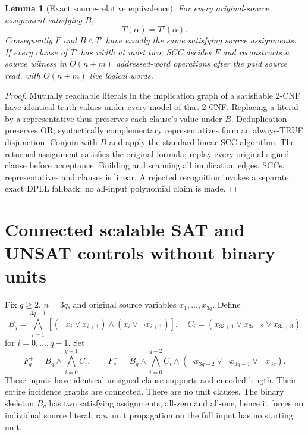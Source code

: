 \documentclass[11pt]{article}
\newtheorem{lemma}{Lemma}
\begin{document}
\begin{lemma}[Exact source-relative equivalence]\label{lem:scc}
For every original-source assignment satisfying $B$,
\[
T(\alpha)=T'(\alpha).
\]
Consequently $F$ and $B\wedge T'$ have \emph{exactly the same satisfying source assignments}. If every clause of $T'$ has width at most two, SCC decides $F$ and reconstructs a source witness in $O(n+m)$ addressed-word operations after the paid source read, with $O(n+m)$ live logical words.
\end{lemma}
\begin{proof}
Mutually reachable literals in the implication graph of a satisfiable 2-CNF have identical truth values under every model of that 2-CNF. Replacing a literal by a representative thus preserves each clause's value under $B$. Deduplication preserves OR; syntactically complementary representatives form an always-TRUE disjunction. Conjoin with $B$ and apply the standard linear SCC algorithm. The returned assignment satisfies the original formula; replay every original signed clause before acceptance. Building and scanning all implication edges, SCCs, representatives and clauses is linear. A rejected recognition invokes a separate exact DPLL fallback; no all-input polynomial claim is made.
\end{proof}

\section{Connected scalable SAT and UNSAT controls without binary units}
Fix $q\ge2$, $n=3q$, and original source variables $x_1,\ldots,x_{3q}$. Define
\[
B_q=\bigwedge_{i=1}^{3q-1}
[(\neg x_i\vee x_{i+1})\wedge(x_i\vee\neg x_{i+1})],
\quad
C_i=(x_{3i+1}\vee x_{3i+2}\vee x_{3i+3})
\]
for $i=0,\ldots,q-1$. Set
\[
F_q^+=B_q\wedge\bigwedge_{i=0}^{q-1}C_i,\qquad
F_q^-=B_q\wedge\bigwedge_{i=0}^{q-2}C_i\wedge
(\neg x_{3q-2}\vee\neg x_{3q-1}\vee\neg x_{3q}).
\]
These inputs have identical unsigned clause supports and encoded length. Their entire incidence graphs are connected. There are no unit clauses. The binary skeleton $B_q$ has two satisfying assignments, all-zero and all-one, hence it forces no individual source literal; raw unit propagation on the full input has no starting unit.
\end{document}

